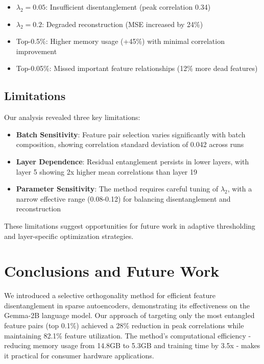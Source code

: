 \documentclass{article} %
\begin{document}
\begin{itemize}
    \item $\lambda_2 = 0.05$: Insufficient disentanglement (peak correlation 0.34)
    \item $\lambda_2 = 0.2$: Degraded reconstruction (MSE increased by 24\%)
    \item Top-0.5\%: Higher memory usage (+45\%) with minimal correlation improvement
    \item Top-0.05\%: Missed important feature relationships (12\% more dead features)
\end{itemize}

\subsection{Limitations}
Our analysis revealed three key limitations:

\begin{itemize}
    \item \textbf{Batch Sensitivity}: Feature pair selection varies significantly with batch composition, showing correlation standard deviation of 0.042 across runs
    \item \textbf{Layer Dependence}: Residual entanglement persists in lower layers, with layer 5 showing 2x higher mean correlations than layer 19
    \item \textbf{Parameter Sensitivity}: The method requires careful tuning of $\lambda_2$, with a narrow effective range (0.08-0.12) for balancing disentanglement and reconstruction
\end{itemize}

These limitations suggest opportunities for future work in adaptive thresholding and layer-specific optimization strategies.

\section{Conclusions and Future Work}
\label{sec:conclusion}

We introduced a selective orthogonality method for efficient feature disentanglement in sparse autoencoders, demonstrating its effectiveness on the Gemma-2B language model. Our approach of targeting only the most entangled feature pairs (top 0.1\%) achieved a 28\% reduction in peak correlations while maintaining 82.1\% feature utilization. The method's computational efficiency - reducing memory usage from 14.8GB to 5.3GB and training time by 3.5x - makes it practical for consumer hardware applications.
\end{document}
